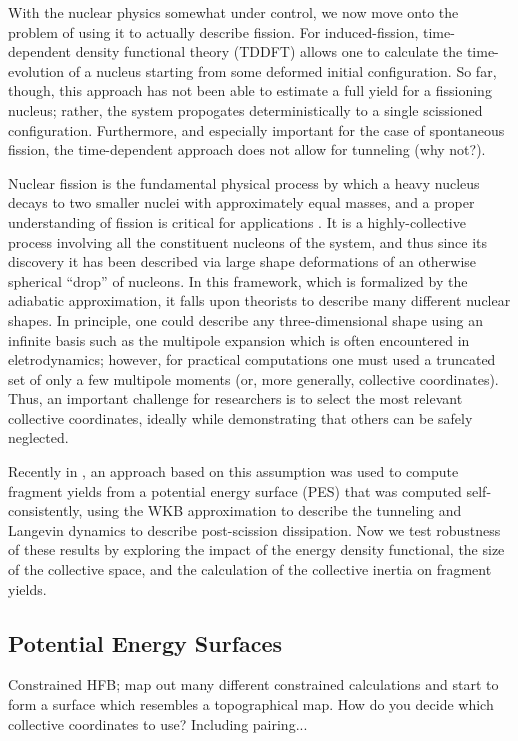 With the nuclear physics somewhat under control, we now move onto the problem of using it to actually describe fission. For induced-fission, time-dependent density functional theory (TDDFT) allows one to calculate the time-evolution of a nucleus starting from some deformed initial configuration. So far, though, this approach has not been able to estimate a full yield for a fissioning nucleus; rather, the system propogates deterministically to a single scissioned configuration. Furthermore, and especially important for the case of spontaneous fission, the time-dependent approach does not allow for tunneling (why not?).

Nuclear fission is the fundamental physical process by which a heavy nucleus decays to two smaller nuclei with approximately equal masses, and a proper understanding of fission is critical for applications . It is a highly-collective process involving all the constituent nucleons of the system, and thus since its discovery it has been described via large shape deformations of an otherwise spherical ``drop'' of nucleons. In this framework, which is formalized by the adiabatic approximation, it falls upon theorists to describe many different nuclear shapes. In principle, one could describe any three-dimensional shape using an infinite basis such as the multipole expansion which is often encountered in eletrodynamics; however, for practical computations one must used a truncated set of only a few multipole moments (or, more generally, collective coordinates). Thus, an important challenge for researchers is to select the most relevant collective coordinates, ideally while demonstrating that others can be safely neglected.

Recently in \cite{Sadhukhan2016}, an approach based on this assumption was used to compute fragment yields from a potential energy surface (PES) that was computed self-consistently, using the WKB approximation to describe the tunneling and Langevin dynamics to describe post-scission dissipation. Now we test robustness of these results by exploring the impact of the energy density functional, the size of the collective space, and the calculation of the collective inertia on fragment yields.

\subsection{Potential Energy Surfaces}
Constrained HFB; map out many different constrained calculations and start to form a surface which resembles a topographical map. How do you decide which collective coordinates to use? Including pairing...

